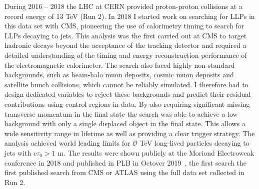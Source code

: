 \documentclass[11pt]{article}
\theoremstyle{plain} \numberwithin{equation}{section}
\theoremstyle{definition}
\begin{document}
During 2016 -- 2018 the LHC at CERN provided proton-proton collisions at a record energy of 13 TeV (Run 2).
In 2018 I started work on searching for LLPs in this data set with CMS, 
pioneering the use of calorimetry timing to search for LLPs decaying to jets. This analysis was the first carried 
out at CMS to target hadronic decays beyond the acceptance of the tracking detector and required a detailed
understanding of the timing and energy reconstruction performance of the electromagnetic calorimeter. 
The search also faced highly non-standard backgrounds, such as beam-halo muon deposits, cosmic muon deposits
and satellite bunch collisions, which cannot be reliably simulated. I therefore had to design 
dedicated variables to reject these backgrounds and predict their residual contributions using control regions
in data. By also requiring significant missing transverse momentum in the final state the search 
was able to achieve a low background with only a single displaced object in the final state. This allows
a wide sensitivity range in lifetime as well as providing a clear trigger strategy. The analysis achieved 
world leading limits for $\mathcal{O}$ TeV long-lived particles decaying to jets with $c\tau_{0} > 1$ m. 
The results were shown publicly at the Moriond Electroweak conference in 2018 and published in PLB in Octover 2019~\cite{XX}, 
the first search the first published search from CMS or ATLAS using the full data set collected in Run 2. 
\end{document}
